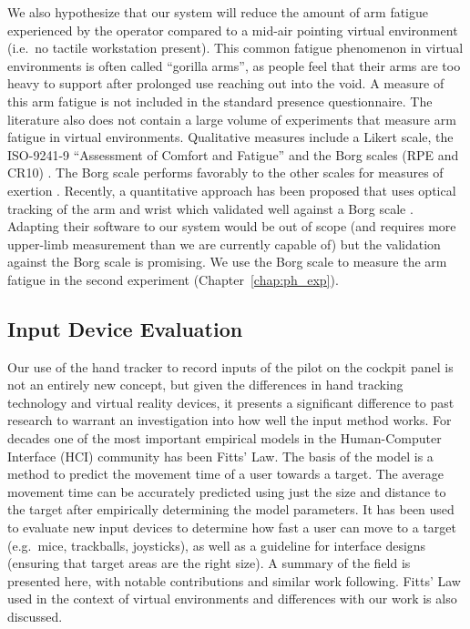 We also hypothesize that our system will reduce the amount of arm fatigue experienced by the operator compared to a mid-air pointing virtual environment (i.e.\ no tactile workstation present).
This common fatigue phenomenon in virtual environments is often called ``gorilla arms'', as people feel that their arms are too heavy to support after prolonged use reaching out into the void.
A measure of this arm fatigue is not included in the standard presence questionnaire.
The literature also does not contain a large volume of experiments that measure arm fatigue in virtual environments.
Qualitative measures include a Likert scale, the ISO-9241-9 ``Assessment of Comfort and Fatigue'' and the Borg scales (RPE and CR10) \citep{borg_borg_1998}.
The Borg scale performs favorably to the other scales for measures of exertion \citep{grant_comparison_1999}.
Recently, a quantitative approach has been proposed that uses optical tracking of the arm and wrist which validated well against a Borg scale \citep{hincapie-ramos_consumed_2014}.
Adapting their software to our system would be out of scope (and requires more upper-limb measurement than we are currently capable of) but the validation against the Borg scale is promising.
We use the Borg scale to measure the arm fatigue in the second experiment (Chapter~\ref{chap:ph_exp}).

\subsection{Input Device Evaluation}
\label{input-device-evaluation}

Our use of the hand tracker to record inputs of the pilot on the cockpit panel is not an entirely new concept, but given the differences in hand tracking technology and virtual reality devices, it presents a significant difference to past research to warrant an investigation into how well the input method works.
For decades one of the most important empirical models in the Human-Computer Interface (HCI) community has been Fitts' Law.
The basis of the model is a method to predict the movement time of a user towards a target.
The average movement time can be accurately predicted using just the size and distance to the target after empirically determining the model parameters.
It has been used to evaluate new input devices to determine how fast a user can move to a target (e.g.\ mice, trackballs, joysticks), as well as a guideline for interface designs (ensuring that target areas are the right size).
A summary of the field is presented here, with notable contributions and similar work following.
Fitts' Law used in the context of virtual environments and differences with our work is also discussed.

